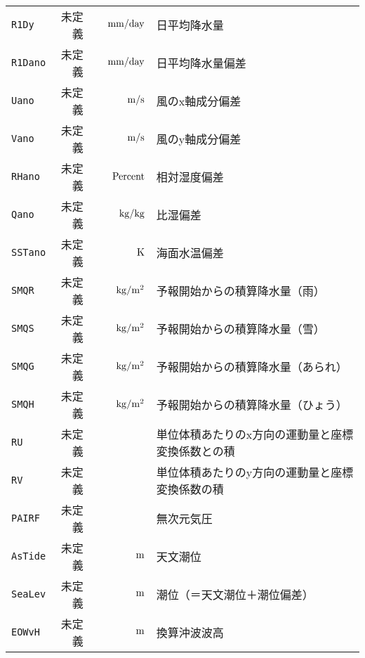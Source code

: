 \begin{longtable}{l|rrrp{}}
{\tt R1Dy} & 未定義 &  & ${\rm\,mm/day}$ & 日平均降水量 \\
{\tt R1Dano} & 未定義 &  & ${\rm\,mm/day}$ & 日平均降水量偏差 \\
{\tt Uano} & 未定義 &  & ${\rm\,m/s}$ & 風のx軸成分偏差 \\
{\tt Vano} & 未定義 &  & ${\rm\,m/s}$ & 風のy軸成分偏差 \\
{\tt RHano} & 未定義 &  & ${\rm\,Percent}$ & 相対湿度偏差 \\
{\tt Qano} & 未定義 &  & ${\rm\,kg/kg}$ & 比湿偏差 \\
{\tt SSTano} & 未定義 &  & ${\rm\,K}$ & 海面水温偏差 \\
{\tt SMQR} & 未定義 &  & ${\rm\,kg/m^2}$ & 予報開始からの積算降水量（雨） \\
{\tt SMQS} & 未定義 &  & ${\rm\,kg/m^2}$ & 予報開始からの積算降水量（雪） \\
{\tt SMQG} & 未定義 &  & ${\rm\,kg/m^2}$ & 予報開始からの積算降水量（あられ） \\
{\tt SMQH} & 未定義 &  & ${\rm\,kg/m^2}$ & 予報開始からの積算降水量（ひょう） \\
{\tt RU} & 未定義 &  &  & 単位体積あたりのx方向の運動量と座標変換係数との積 \\
{\tt RV} & 未定義 &  &  & 単位体積あたりのy方向の運動量と座標変換係数の積 \\
{\tt PAIRF} & 未定義 &  &  & 無次元気圧 \\
{\tt AsTide} & 未定義 &  & ${\rm\,m}$ & 天文潮位 \\
{\tt SeaLev} & 未定義 &  & ${\rm\,m}$ & 潮位（＝天文潮位＋潮位偏差） \\
{\tt EOWvH} & 未定義 &  & ${\rm\,m}$ & 換算沖波波高 \\
\hline
\end{longtable}
